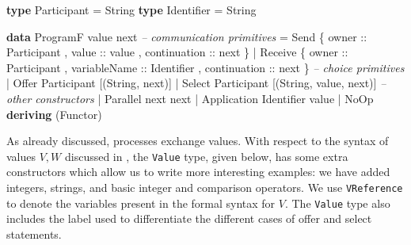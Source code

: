 \documentclass[runningheads,plain]{llncs}
\newenvironment{Shaded}{}{}
\newcommand{\KeywordTok}[1]{\textcolor[rgb]{0.00,0.44,0.13}{\textbf{#1}}}
\newcommand{\DataTypeTok}[1]{\textcolor[rgb]{0.56,0.13,0.00}{#1}}
\newcommand{\CommentTok}[1]{\textcolor[rgb]{0.38,0.63,0.69}{\textit{#1}}}
\newcommand{\OtherTok}[1]{\textcolor[rgb]{0.00,0.44,0.13}{#1}}
\newcommand{\FunctionTok}[1]{\textcolor[rgb]{0.02,0.16,0.49}{#1}}
\newcommand{\NormalTok}[1]{#1}
\begin{document}
\begin{Shaded}
\begin{Highlighting}[]
\KeywordTok{type} \DataTypeTok{Participant} \FunctionTok{=} \DataTypeTok{String}
\KeywordTok{type} \DataTypeTok{Identifier} \FunctionTok{=} \DataTypeTok{String}

\KeywordTok{data} \DataTypeTok{ProgramF}\NormalTok{ value next }
    \CommentTok{-- communication primitives}
    \FunctionTok{=} \DataTypeTok{Send} 
\NormalTok{        \{}\OtherTok{ owner ::} \DataTypeTok{Participant}
\NormalTok{        ,}\OtherTok{ value ::}\NormalTok{ value}
\NormalTok{        ,}\OtherTok{ continuation ::}\NormalTok{ next }
\NormalTok{        \}}
    \FunctionTok{|} \DataTypeTok{Receive} 
\NormalTok{        \{}\OtherTok{ owner ::} \DataTypeTok{Participant}
\NormalTok{        ,}\OtherTok{ variableName ::} \DataTypeTok{Identifier}
\NormalTok{        ,}\OtherTok{ continuation ::}\NormalTok{ next  }
\NormalTok{        \}}
 \CommentTok{-- choice primitives}
    \FunctionTok{|} \DataTypeTok{Offer} \DataTypeTok{Participant}\NormalTok{ [}\NormalTok{(}\DataTypeTok{String}\NormalTok{, next)]}
    \FunctionTok{|} \DataTypeTok{Select} \DataTypeTok{Participant}\NormalTok{ [}\NormalTok{(}\DataTypeTok{String}\NormalTok{, value, next)]}
 \CommentTok{-- other constructors }
    \FunctionTok{|} \DataTypeTok{Parallel}\NormalTok{ next next }
    \FunctionTok{|} \DataTypeTok{Application} \DataTypeTok{Identifier}\NormalTok{ value}
    \FunctionTok{|} \DataTypeTok{NoOp}
    \KeywordTok{deriving}\NormalTok{ (}\DataTypeTok{Functor}\NormalTok{) }
\end{Highlighting}
\end{Shaded}

\noindent
As already discussed, processes exchange values. 
With respect to the syntax of values $V, W$ discussed in ,
the \texttt{Value} type, given below, has some extra constructors which allow us to write more interesting examples: 
we have added integers, strings, and basic integer and comparison operators. 
We use \texttt{VReference} to denote the variables present in the formal syntax for $V$.
The \texttt{Value} type also includes the label used to differentiate the different cases of offer and select statements.
\end{document}
